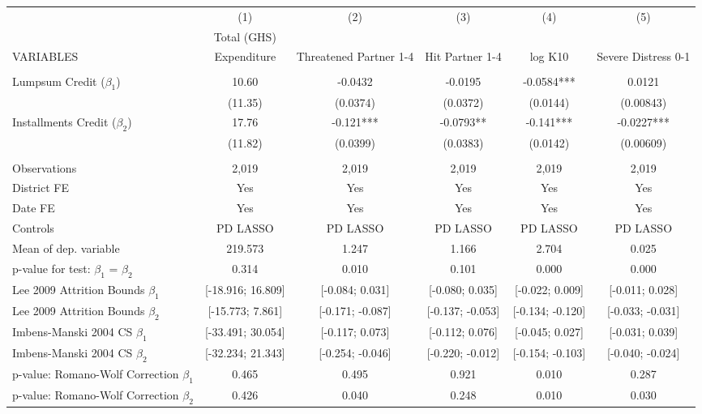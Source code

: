 \begin{tabular}{lccccc} \hline
 & (1) & (2) & (3) & (4) & (5) \\
 & Total (GHS) &  &  &  &  \\
VARIABLES & Expenditure & Threatened Partner 1-4 & Hit Partner 1-4 & log K10 & Severe Distress 0-1 \\ \hline
 &  &  &  &  &  \\
Lumpsum Credit ($\beta_1$) & 10.60 & -0.0432 & -0.0195 & -0.0584*** & 0.0121 \\
 & (11.35) & (0.0374) & (0.0372) & (0.0144) & (0.00843) \\
Installments Credit ($\beta_2$) & 17.76 & -0.121*** & -0.0793** & -0.141*** & -0.0227*** \\
 & (11.82) & (0.0399) & (0.0383) & (0.0142) & (0.00609) \\
 &  &  &  &  &  \\
Observations & 2,019 & 2,019 & 2,019 & 2,019 & 2,019 \\
District FE & Yes & Yes & Yes & Yes & Yes \\
Date FE & Yes & Yes & Yes & Yes & Yes \\
Controls & PD LASSO & PD LASSO & PD LASSO & PD LASSO & PD LASSO \\
Mean of dep. variable & 219.573 & 1.247 & 1.166 & 2.704 & 0.025 \\
p-value for test: $\beta_1$ = $\beta_2$ & 0.314 & 0.010 & 0.101 & 0.000 & 0.000 \\
Lee 2009 Attrition Bounds $\beta_1$ & [-18.916; 16.809] & [-0.084; 0.031] & [-0.080; 0.035] & [-0.022; 0.009] & [-0.011; 0.028] \\
Lee 2009 Attrition Bounds $\beta_2$ & [-15.773; 7.861] & [-0.171; -0.087] & [-0.137; -0.053] & [-0.134; -0.120] & [-0.033; -0.031] \\
Imbens-Manski 2004 CS $\beta_1$ & [-33.491; 30.054] & [-0.117; 0.073] & [-0.112; 0.076] & [-0.045; 0.027] & [-0.031; 0.039] \\
Imbens-Manski 2004 CS $\beta_2$ & [-32.234; 21.343] & [-0.254; -0.046] & [-0.220; -0.012] & [-0.154; -0.103] & [-0.040; -0.024] \\
p-value: Romano-Wolf Correction $\beta_1$ & 0.465 & 0.495 & 0.921 & 0.010 & 0.287 \\
 p-value: Romano-Wolf Correction $\beta_2$ & 0.426 & 0.040 & 0.248 & 0.010 & 0.030 \\ \hline
\end{tabular}
